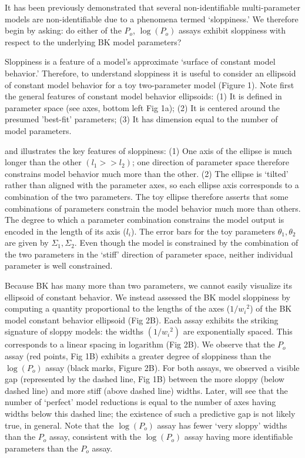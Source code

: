 \documentclass[10pt]{amsart}
\newcommand\Po{P_o}
\newcommand\po{P_o}
\newcommand\lpo{\log(\Po)}
\begin{document}
It has been previously demonstrated that several non-identifiable multi-parameter models are non-identifiable due to a phenomena termed `sloppiness.'  We therefore begin by asking: do either of the $\po$, $\lpo$ assays exhibit sloppiness with respect to the underlying BK model parameters?  

Sloppiness is a feature of a model's approximate `surface of constant model behavior.'  Therefore, to understand sloppiness it is useful to consider an ellipsoid of constant model behavior for a toy two-parameter model (Figure 1).  Note first the general features of constant model behavior ellipsoids: (1) It is defined in parameter space (see axes, bottom left Fig 1a); (2) It is centered around the presumed 'best-fit' parameters; (3) It has dimension equal to the number of model parameters.  

 and illustrates the key features of sloppiness: (1) One axis of the ellipse is much longer than the other $(l_1>>l_2)$; one direction of parameter space therefore constrains model behavior much more than the other.  (2) The ellipse is `tilted' rather than aligned with the parameter axes, so each ellipse axis corresponds to a combination of the two parameters.  The toy ellipse therefore asserts that some combinations of parameters constrain the model behavior much more than others.  The degree to which a parameter combination constrains the model output is encoded in the length of its axis ($l_i$).  The error bars for the toy parameters $\theta_1, \theta_2$ are given by $\Sigma_1, \Sigma_2.$  Even though the model is constrained by the combination of the two parameters in the `stiff' direction of parameter space, neither individual parameter is well constrained.


Because BK has many more than two parameters, we cannot easily visualize its ellipsoid of constant behavior.  We instead assessed the BK model sloppiness by computing a quantity proportional to the lengths of the axes ($1/{w_i}^2$) of the BK model constant behavior ellipsoid (Fig 2B).  Each assay exhibits the striking signature of sloppy models: the widths $(1/{w_i}^2)$ are exponentially spaced.  This corresponds to a linear spacing in logarithm (Fig 2B).  We observe that the $\po$ assay (red points, Fig 1B) exhibits a greater degree of sloppiness than the $\lpo$ assay (black marks, Figure 2B).  For both assays, we observed a visible gap (represented by the dashed line, Fig 1B) between the more sloppy (below dashed line) and more stiff (above dashed line) widths.  Later, will see that the number of `perfect' model reductions is equal to the number of axes having widths below this dashed line; the existence of such a predictive gap is not likely true, in general.  Note that the $\lpo$ assay has fewer `very sloppy' widths than the $\po$ assay, consistent with the $\lpo$ assay having more identifiable parameters than the $\po$ assay.
\end{document}
